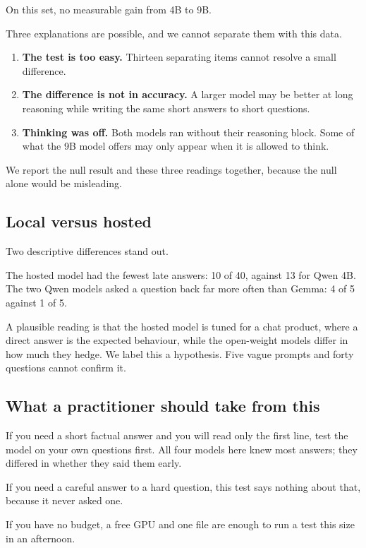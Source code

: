 \documentclass[11pt,a4paper]{article}
\begin{document}
On this set, no measurable gain from 4B to 9B.

Three explanations are possible, and we cannot separate them with this data.

\begin{enumerate}
  \item \textbf{The test is too easy.} Thirteen separating items cannot resolve a small difference.
  \item \textbf{The difference is not in accuracy.} A larger model may be better at long reasoning while writing the same short answers to short questions.
  \item \textbf{Thinking was off.} Both models ran without their reasoning block. Some of what the 9B model offers may only appear when it is allowed to think.
\end{enumerate}

We report the null result and these three readings together, because the null alone would be misleading.

\subsection{Local versus hosted}

Two descriptive differences stand out.

The hosted model had the fewest late answers: 10 of 40, against 13 for Qwen 4B. The two Qwen models asked a question back far more often than Gemma: 4 of 5 against 1 of 5.

A plausible reading is that the hosted model is tuned for a chat product, where a direct answer is the expected behaviour, while the open-weight models differ in how much they hedge. We label this a hypothesis. Five vague prompts and forty questions cannot confirm it.

\subsection{What a practitioner should take from this}

If you need a short factual answer and you will read only the first line, test the model on your own questions first. All four models here knew most answers; they differed in whether they said them early.

If you need a careful answer to a hard question, this test says nothing about that, because it never asked one.

If you have no budget, a free GPU and one file are enough to run a test this size in an afternoon.
\end{document}
